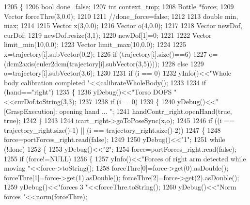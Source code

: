 \begin{DoxyCode}
1205 \{
1206     \textcolor{keywordtype}{bool} done=\textcolor{keyword}{false};
1207     \textcolor{keywordtype}{int} context\_tmp;
1208     Bottle *force;
1209     Vector forceThre(3,0.0);
1210 
1211     \textcolor{comment}{//done\_force=false;}
1212 
1213     \textcolor{keywordtype}{double} min, max;
1214 
1215     Vector x(3,0.0);
1216     Vector o(4,0.0);
1217 
1218     Vector newDof, curDof;
1219     newDof.resize(3,1);
1220     newDof[1]=0;
1221 
1222     Vector limit\_min(10,0.0);
1223     Vector limit\_max(10,0.0);
1224 
1225     x=trajectory[i].subVector(0,2);
1226     \textcolor{keywordflow}{if} (trajectory[i].size()==6)
1227         o=(dcm2axis(euler2dcm(trajectory[i].subVector(3,5))));
1228     \textcolor{keywordflow}{else}
1229         o=trajectory[i].subVector(3,6);
1230 
1231     \textcolor{keywordflow}{if} (i == 0)
1232             yInfo()<<\textcolor{stringliteral}{"Whole body calibration completed "}<<calibrateWholeBody();
1233 
1234     \textcolor{keywordflow}{if} (hand==\textcolor{stringliteral}{"right"})
1235     \{        
1236         yDebug()<<\textcolor{stringliteral}{"Torso DOFS "}<<curDof.toString(3,3);
1237 
1238         \textcolor{keywordflow}{if} (i==0)
1239         \{
1240             yDebug()<<\textcolor{stringliteral}{"[GraspExecution]: opening hand ... "};
1241             handContr_right.openHand(\textcolor{keyword}{true}, \textcolor{keyword}{true});
1242         \}
1243 
1244         icart\_right->goToPoseSync(x,o);
1245 
1246         \textcolor{keywordflow}{if} ((i == trajectory\_right.size()-1) || (i == trajectory\_right.size()-2))
1247         \{  
1248             force=portForces\_right.read(\textcolor{keyword}{false});    
1249 
1250             yDebug()<<\textcolor{stringliteral}{"1"};     
1251             \textcolor{keywordflow}{while} (!done)
1252             \{
1253                  yDebug()<<\textcolor{stringliteral}{"2"};    
1254                 force=portForces\_right.read(\textcolor{keyword}{false});
1255                 \textcolor{keywordflow}{if} (force!=NULL)
1256                 \{
1257                     yInfo()<<\textcolor{stringliteral}{"Forces of right arm detected while moving     "}<<force->toString();
1258                     forceThre[0]=force->get(0).asDouble();  forceThre[1]=force->get(1).asDouble();  
      forceThre[2]=force->get(2).asDouble();       
1259                     yDebug()<<\textcolor{stringliteral}{"forces 3 "}<<forceThre.toString();  
1260                     yDebug()<<\textcolor{stringliteral}{"Norm forces "}<<norm(forceThre);  

\end{DoxyCode}
